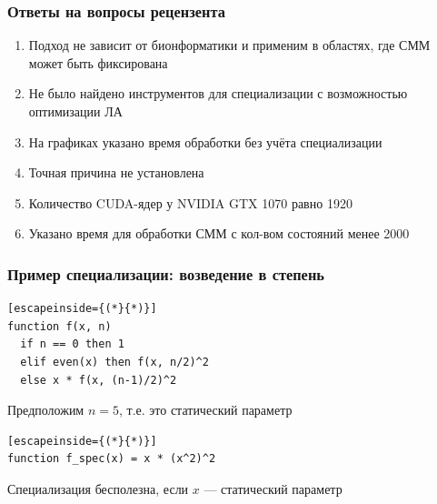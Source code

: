 \documentclass{beamer}
\newcommand{\backupbegin}{
   \newcounter{finalframe}
   \setcounter{finalframe}{\value{framenumber}}
}
\begin{document}

\appendix
\backupbegin

\begin{frame}
	\frametitle{Ответы на вопросы рецензента}
\begin{enumerate}
	\item Подход не зависит от бионформатики и применим в областях, где СММ может быть фиксирована
	\vfill
	\item Не было найдено инструментов для специализации с возможностью оптимизации ЛА
	\vfill
	\item На графиках указано время обработки без учёта специализации
	\vfill
	\item Точная причина не установлена
	\vfill
	\item Количество CUDA-ядер у NVIDIA GTX 1070 равно 1920 
	\vfill
	\item Указано время для обработки СММ с кол-вом состояний менее 2000
\end{enumerate}
\end{frame}

\begin{frame}[fragile]
	\frametitle{Пример специализации: возведение в степень}
\begin{lstlisting}[escapeinside={(*}{*)}]
function f(x, n)
  if n == 0 then 1
  elif even(x) then f(x, n/2)^2
  else x * f(x, (n-1)/2)^2
\end{lstlisting}
	\vfill
	Предположим $\mathit{n = 5}$, т.е. это статический параметр
	\vfill
\begin{lstlisting}[escapeinside={(*}{*)}]
function f_spec(x) = x * (x^2)^2
\end{lstlisting}
	\vfill
	Специализация бесполезна, если $x$ --- статический параметр
\end{frame}
\end{document}
